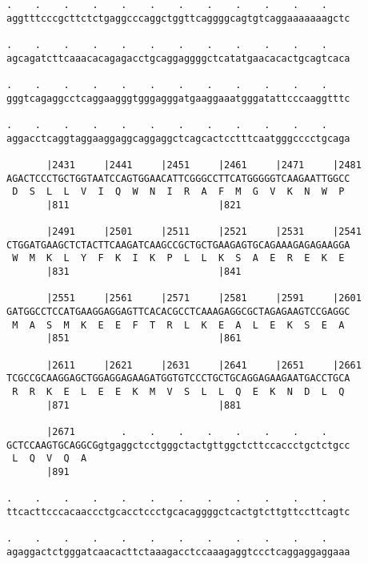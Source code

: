\documentclass{article}
\begin{document}
\begin{Verbatim}
.    .    .    .    .    .    .    .    .    .    .    .    
aggtttcccgcttctctgaggcccaggctggttcaggggcagtgtcaggaaaaaaagctc
                                                            
.    .    .    .    .    .    .    .    .    .    .    .    
agcagatcttcaaacacagagacctgcaggaggggctcatatgaacacactgcagtcaca
                                                            
.    .    .    .    .    .    .    .    .    .    .    .    
gggtcagaggcctcaggaagggtgggagggatgaaggaaatgggatattcccaaggtttc
                                                            
.    .    .    .    .    .    .    .    .    .    .    .    
aggacctcaggtaggaaggaggcaggaggctcagcactcctttcaatgggcccctgcaga
                                                            
       |2431     |2441     |2451     |2461     |2471     |2481
AGACTCCCTGCTGGTAATCCAGTGGAACATTCGGGCCTTCATGGGGGTCAAGAATTGGCC
 D  S  L  L  V  I  Q  W  N  I  R  A  F  M  G  V  K  N  W  P 
       |811                          |821                   
  
       |2491     |2501     |2511     |2521     |2531     |2541
CTGGATGAAGCTCTACTTCAAGATCAAGCCGCTGCTGAAGAGTGCAGAAAGAGAGAAGGA
 W  M  K  L  Y  F  K  I  K  P  L  L  K  S  A  E  R  E  K  E 
       |831                          |841                   
  
       |2551     |2561     |2571     |2581     |2591     |2601
GATGGCCTCCATGAAGGAGGAGTTCACACGCCTCAAAGAGGCGCTAGAGAAGTCCGAGGC
 M  A  S  M  K  E  E  F  T  R  L  K  E  A  L  E  K  S  E  A 
       |851                          |861                   
  
       |2611     |2621     |2631     |2641     |2651     |2661
TCGCCGCAAGGAGCTGGAGGAGAAGATGGTGTCCCTGCTGCAGGAGAAGAATGACCTGCA
 R  R  K  E  L  E  E  K  M  V  S  L  L  Q  E  K  N  D  L  Q 
       |871                          |881                   
  
       |2671        .    .    .    .    .    .    .    .    
GCTCCAAGTGCAGGCGgtgaggctcctgggctactgttggctcttccaccctgctctgcc
 L  Q  V  Q  A                                              
       |891                                                 
  
.    .    .    .    .    .    .    .    .    .    .    .    
ttcacttcccacaaccctgcacctccctgcacaggggctcactgtcttgttccttcagtc
                                                            
.    .    .    .    .    .    .    .    .    .    .    .    
agaggactctgggatcaacacttctaaagacctccaaagaggtccctcaggaggaggaaa
                                                            

\end{Verbatim}
\end{document}
